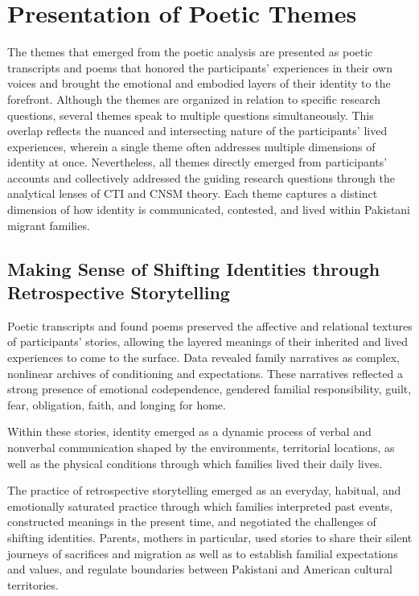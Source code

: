 \section{Presentation of Poetic Themes}

The themes that emerged from the poetic analysis are presented as poetic transcripts and poems that honored the participants’ experiences in their own voices and brought the emotional and embodied layers of their identity to the forefront. Although the themes are organized in relation to specific research questions, several themes speak to multiple questions simultaneously. This overlap reflects the nuanced and intersecting nature of the participants’ lived experiences, wherein a single theme often addresses multiple dimensions of identity at once. Nevertheless, all themes directly emerged from participants’ accounts and collectively addressed the guiding research questions through the analytical lenses of CTI and CNSM theory. Each theme captures a distinct dimension of how identity is communicated, contested, and lived within Pakistani migrant families.

\subsection{Making Sense of Shifting Identities through Retrospective Storytelling}

Poetic transcripts and found poems preserved the affective and relational textures of participants’ stories, allowing the layered meanings of their inherited and lived experiences to come to the surface. Data revealed family narratives as complex, nonlinear archives of conditioning and expectations. These narratives reflected a strong presence of emotional codependence, gendered familial responsibility, guilt, fear, obligation, faith, and longing for home. 

Within these stories, identity emerged as a dynamic process of verbal and nonverbal communication shaped by the environments, territorial locations, as well as the physical conditions through which families lived their daily lives. 

The practice of retrospective storytelling emerged as an everyday, habitual, and emotionally saturated practice through which families interpreted past events, constructed meanings in the present time, and negotiated the challenges of shifting identities. Parents, mothers in particular, used stories to share their silent journeys of sacrifices and migration as well as to establish familial expectations and values, and regulate boundaries between Pakistani and American cultural territories.

